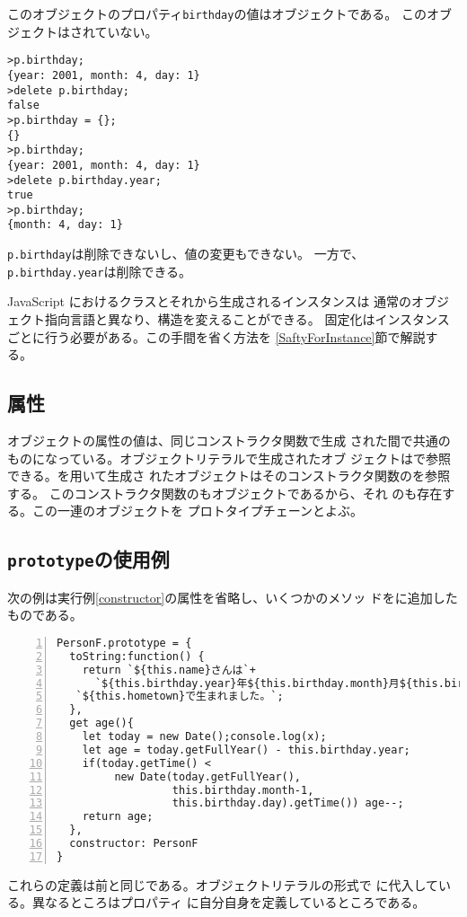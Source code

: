 \begin{Exec}
このオブジェクトのプロパティ\texttt{birthday}の値はオブジェクトである。
このオブジェクトはされていない。
\begin{Verbatim}
>p.birthday;
{year: 2001, month: 4, day: 1}
>delete p.birthday;
false
>p.birthday = {};
{}
>p.birthday;
{year: 2001, month: 4, day: 1}
>delete p.birthday.year;
true
>p.birthday;
{month: 4, day: 1}
\end{Verbatim}
 \texttt{p.birthday}は削除できないし、値の変更もできない。
 一方で、\texttt{p.birthday.year}は削除できる。
 \end{Exec}
 
 JavaScript におけるクラスとそれから生成されるインスタンスは
 通常のオブジェクト指向言語と異なり、構造を変えることができる。
 固定化はインスタンスごとに行う必要がある。この手間を省く方法を
 \ref{SaftyForInstance}節で解説する。
 \subsection{\protect{}属性}
 オブジェクトの属性の値は、同じコンストラクタ関数で生成
 された間で共通のものになっている。オブジェクトリテラルで生成されたオブ
 ジェクトはで参照できる。を用いて生成さ
 れたオブジェクトはそのコンストラクタ関数のを参照する。
 このコンストラクタ関数のもオブジェクトであるから、それ
 のも存在する。この一連のオブジェクトを
 プロトタイプチェーンとよぶ。

 \iffalse
 \JS で定義されている \ElmJ{Object.create()} メソッドは引数で与
 えられたオブジェクトの\ElmJ{prototype}を\ElmJ{prototype}に持つオブジェ
 クトを生成する。このメソッドに対して2番目の引数を与えて、新たに生成され
 たオブジェクトのプロパティを指定できる。
 \fi
 \subsection{\protect\texttt{prototype}の使用例}
 \begin{Exec}\upshape\label{ExecConst2}
  次の例は実行例\ref{constructor}の属性を省略し、いくつかのメソッ
 ドをに追加したものである。
\begin{Verbatim}[numbers=left]
PersonF.prototype = {
  toString:function() {
    return `${this.name}さんは`+
      `${this.birthday.year}年${this.birthday.month}月${this.birthday.day}日に` +
   `${this.hometown}で生まれました。`;
  },
  get age(){
    let today = new Date();console.log(x);
    let age = today.getFullYear() - this.birthday.year;
    if(today.getTime() <
         new Date(today.getFullYear(),
                  this.birthday.month-1,
                  this.birthday.day).getTime()) age--;
    return age;
  },
  constructor: PersonF
}
\end{Verbatim}
 \end{Exec}
これらの定義は前と同じである。オブジェクトリテラルの形式で
に代入している。異なるところはプロパティ
に自分自身を定義しているところである。

